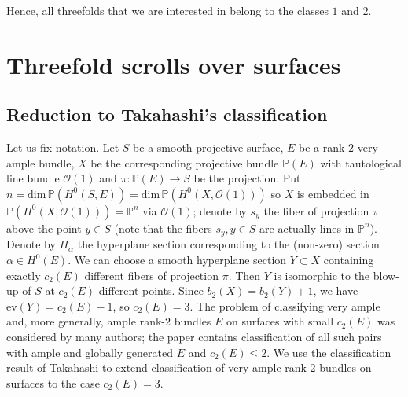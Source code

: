 \documentclass[a4paper]{amsart}
\theoremstyle{plain}
\theoremstyle{definition}
\begin{document}
Hence, all threefolds that we are interested in belong to the classes $1$ and $2$.

\section{Threefold scrolls over surfaces}
\label{scrolls}
\subsection{Reduction to Takahashi's classification}
\label{reduction_takahashi}
Let us fix notation. Let $S$ be a smooth projective surface, $E$ be a rank $2$ very ample bundle, $X$ be the corresponding projective bundle $\mathbb P(E)$ with tautological line bundle $\mathcal O(1)$ and $\pi \colon \mathbb P(E) \to S$ be the projection.
Put $n =\mathrm {dim}\, \mathbb P(H^0(S, E)) = \mathrm {dim}\, \mathbb P(H^0(X, \mathcal O(1)))$
so $X$ is embedded in $\mathbb P(H^0(X, \mathcal O(1))) = \mathbb P^n$ via $\mathcal O(1)$; denote by $s_y$ the fiber of projection $\pi$ above the point $y \in S$
(note that the fibers $s_y, y \in S$ are actually lines in $\mathbb P^n$). Denote by $H_{\alpha}$ the hyperplane section corresponding to the (non-zero) section $\alpha \in H^0(E)$.
We can choose a smooth hyperplane section $Y \subset X$ containing exactly $c_2(E)$ different fibers of projection $\pi$.
Then $Y$ is isomorphic to the blow-up of $S$ at $c_2(E)$ different points.
Since $b_2(X) = b_2(Y)+1$, we have $\mathrm{ev}(Y) = c_2(E) - 1$, so $c_2(E) = 3$.
The problem of classifying very ample and, more generally, ample rank-$2$ bundles $E$ on surfaces with small $c_2(E)$ was considered by many authors; the paper \cite{Noma1994} contains classification of all such pairs with ample and globally generated $E$ and $c_2(E)\leq 2$.
We use the classification result of Takahashi \cite{Takahashi} to extend classification of very ample rank 2 bundles on surfaces to the case $c_2(E) = 3$.
\end{document}
